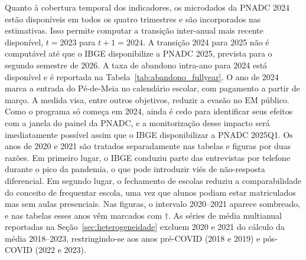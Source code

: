 Quanto à cobertura temporal dos indicadores, os microdados da
PNADC 2024 estão disponíveis em todos os quatro trimestres e
são incorporados nas estimativas. Isso permite computar a
transição inter-anual mais recente disponível, $t = 2023$ para
$t+1 = 2024$. A transição 2024 para 2025 não é computável até
que o IBGE disponibilize a PNADC 2025, prevista para o segundo
semestre de 2026. A taxa de abandono intra-ano para 2024 está
disponível e é reportada na Tabela~\ref{tab:abandono_fullyear}.
O ano de 2024 marca a entrada do Pé-de-Meia
\citep{Brasil2024_PeDeMeia} no calendário escolar, com pagamento
a partir de março. A medida visa, entre outros objetivos,
reduzir a evasão no EM público. Como o programa só começa em
2024, ainda é cedo para identificar seus efeitos com a janela
do painel da PNADC, e a monitorização desse impacto será
imediatamente possível assim que o IBGE disponibilizar a PNADC
2025Q1. Os anos de 2020 e 2021 são tratados separadamente nas
tabelas e figuras por duas razões. Em primeiro lugar, o IBGE
conduziu parte das entrevistas por telefone durante o pico da
pandemia, o que pode introduzir viés de não-resposta
diferencial. Em segundo lugar, o fechamento de escolas reduziu
a comparabilidade do conceito de frequentar escola, uma vez que
alunos podiam estar matriculados mas sem aulas presenciais. Nas
figuras, o intervalo 2020--2021 aparece sombreado, e nas tabelas
esses anos vêm marcados com $\dagger$. As séries de média
multianual reportadas na Seção~\ref{sec:heterogeneidade}
excluem 2020 e 2021 do cálculo da média 2018--2023,
restringindo-se aos anos pré-COVID (2018 e 2019) e pós-COVID
(2022 e 2023).
